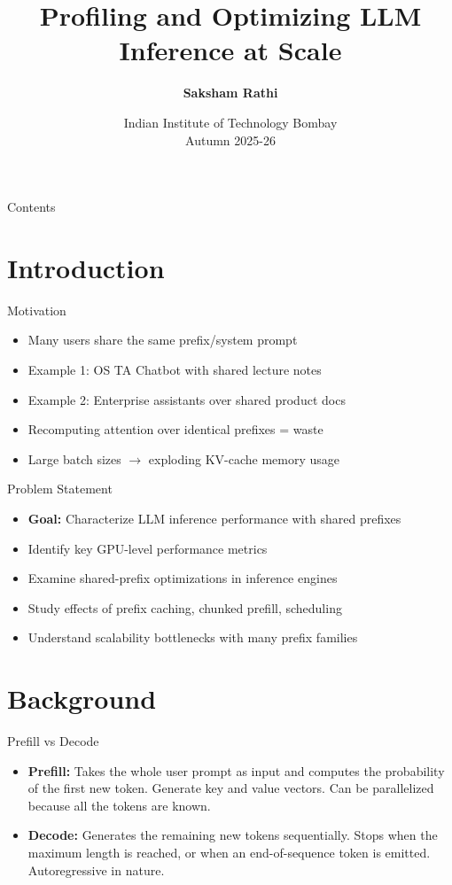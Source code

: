 \documentclass[Serif, 10pt, brown]{beamer}
\title[{Systems for LLMs}]{\sc Profiling and Optimizing LLM Inference at Scale}
\author[\ul{Saksham Rathi}]{{\textbf{Saksham Rathi}}}
\institute[UTD]{\sc\small Bachelor's Thesis Project - Stage 1\\ Under Prof. Mythili Vutukuru}
\date[UCI]{Indian Institute of Technology Bombay \\ Autumn 2025-26}
\theoremstyle{example}
\theoremstyle{plain}
\begin{document}
\frame{\titlepage}

\begin{frame}{Contents}
	\tableofcontents
\end{frame}

\section{Introduction}
\begin{frame}{Motivation}
    \begin{itemize}
        \item Many users share the same prefix/system prompt\pause
        \item Example 1: OS TA Chatbot with shared lecture notes\pause
        \item Example 2: Enterprise assistants over shared product docs \pause
        \item Recomputing attention over identical prefixes = waste \pause
        \item Large batch sizes $\rightarrow$ exploding KV-cache memory usage
    \end{itemize}
\end{frame}

\begin{frame}{Problem Statement}
    \begin{itemize}
        \item \textbf{Goal:} Characterize LLM inference performance with shared prefixes \pause
        \item Identify key GPU-level performance metrics \pause
        \item Examine shared-prefix optimizations in inference engines \pause
        \item Study effects of prefix caching, chunked prefill, scheduling \pause
        \item Understand scalability bottlenecks with many prefix families
    \end{itemize}
\end{frame}

\section{Background}

\begin{frame}{Prefill vs Decode}
\begin{itemize}
    \item \textbf{Prefill:} Takes the whole user prompt as input and computes the probability of the first new token. Generate key and value vectors. Can be parallelized because all the tokens are known. \pause
    \item \textbf{Decode:} Generates the remaining new tokens sequentially. Stops when the maximum length is reached, or when an end-of-sequence token is emitted. Autoregressive in nature.
\end{itemize}
\end{frame}
\end{document}
